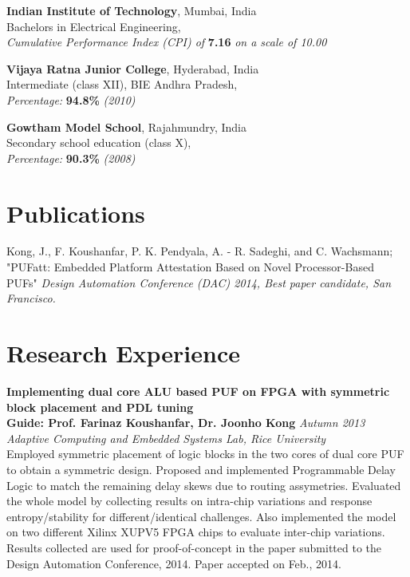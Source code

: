 \documentclass[margin,line]{resume}
\begin{document}
\begin{resume}
		{\bf Indian Institute of Technology}, Mumbai, India\\
		Bachelors in Electrical Engineering,\\
        \textit{\hspace*{2mm}Cumulative Performance Index (CPI) of} \textbf{7.16} \textit{on a scale of 10.00}
        \vspace{-2mm}
        
        {\bf Vijaya Ratna Junior College}, Hyderabad, India\\
		Intermediate (class XII), BIE Andhra Pradesh,\\
        \textit{\hspace*{2mm}Percentage:} \textbf{94.8\%} \textit{(2010)}
        \vspace{-2mm}
        
        {\bf Gowtham Model School}, Rajahmundry, India\\
		Secondary school education (class X),\\
        \textit{\hspace*{2mm}Percentage:} \textbf{90.3\%} \textit{(2008)}
        
\section{\mysidestyle Publications}
	Kong, J., F. Koushanfar, P. K. Pendyala, A. - R. Sadeghi, and C. Wachsmann; "PUFatt: Embedded Platform Attestation Based on Novel Processor-Based PUFs"	\hfill {\textit{Design Automation Conference (DAC) 2014, Best paper candidate, San Francisco.}}\\
	\vspace{-2mm}
	
			
\section{\mysidestyle Research Experience}
	
    {\bf Implementing dual core ALU based PUF on FPGA with symmetric block placement and PDL tuning} \\
    {\bf Guide: Prof. Farinaz Koushanfar, Dr. Joonho Kong} \hfill \textit{Autumn 2013} \\
    {\it Adaptive Computing and Embedded Systems Lab, Rice University} \\
	Employed symmetric placement of logic blocks in the two cores of dual core PUF to obtain a symmetric design. Proposed and implemented Programmable Delay Logic to match the remaining delay skews due to routing assymetries. Evaluated the whole model by collecting results on intra-chip variations and response entropy/stability for different/identical challenges. Also implemented the model on two different Xilinx XUPV5 FPGA chips to evaluate inter-chip variations. Results collected are used for proof-of-concept in the paper submitted to the Design Automation Conference, 2014. Paper accepted on Feb., 2014.
	

\end{resume}
\end{document}
